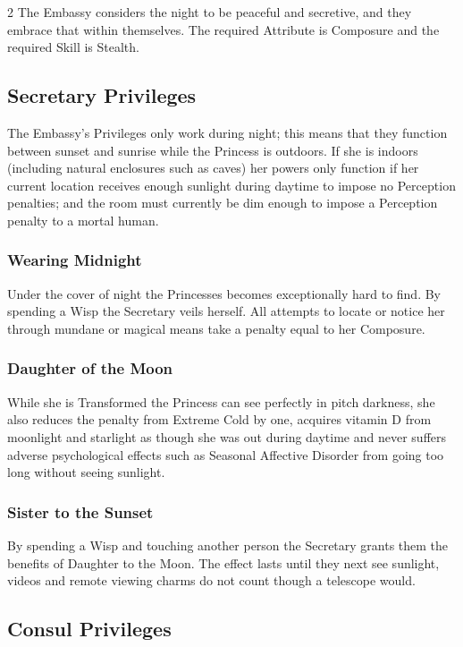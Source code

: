 \begin{multicols}{2}
The Embassy considers the night to be peaceful and secretive, and they embrace that within themselves. The required Attribute is Composure and the required Skill is Stealth. 

\subsection*{Secretary Privileges}

The Embassy’s Privileges only work during night; this means that they function between sunset and sunrise while the Princess is outdoors. If she is indoors (including natural enclosures such as caves) her powers only function if her current location receives enough sunlight during daytime to impose no Perception penalties; and the room must currently be dim enough to impose a Perception penalty to a mortal human. 

\subsubsection*{Wearing Midnight}

Under the cover of night the Princesses becomes exceptionally hard to find. By spending a Wisp the Secretary veils herself. All attempts to locate or notice her through mundane or magical means take a penalty equal to her Composure. 

\subsubsection*{Daughter of the Moon}

While she is Transformed the Princess can see perfectly in pitch darkness, she also reduces the penalty from Extreme Cold by one, acquires vitamin D from moonlight and starlight as though she was out during daytime and never suffers adverse psychological effects such as Seasonal Affective Disorder from going too long without seeing sunlight. 

\subsubsection*{Sister to the Sunset}

By spending a Wisp and touching another person the Secretary grants them the benefits of Daughter to the Moon. The effect lasts until they next see sunlight, videos and remote viewing charms do not count though a telescope would. 

\subsection*{Consul Privileges}


\end{multicols}
